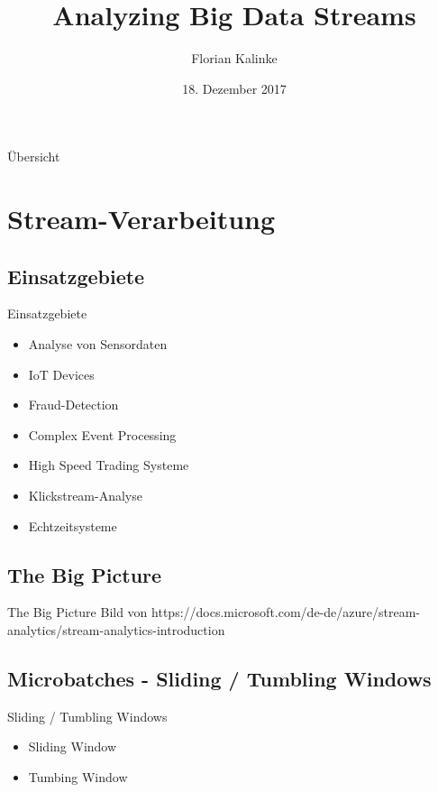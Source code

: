 \documentclass{beamer}
\title{Analyzing Big Data Streams}
\author{Florian Kalinke}
\date{18. Dezember 2017}
\begin{document}
\maketitle

\begin{frame}[t]{Übersicht}
  \tableofcontents
\end{frame}


\section{Stream-Verarbeitung}

\subsection{Einsatzgebiete}
\begin{frame}[t]{Einsatzgebiete}
\begin{itemize}
  \item Analyse von Sensordaten
  \item IoT Devices
  \item Fraud-Detection
  \item Complex Event Processing
  \item High Speed Trading Systeme
  \item Klickstream-Analyse

  \item Echtzeitsysteme
\end{itemize}
\end{frame}

\subsection{The Big Picture}
\begin{frame}[t]{The Big Picture}
  Bild von https://docs.microsoft.com/de-de/azure/stream-analytics/stream-analytics-introduction 
\end{frame}

\subsection{Microbatches - Sliding / Tumbling Windows}
\begin{frame}[t]{Sliding / Tumbling Windows}
\begin{itemize}
  \item Sliding Window
  \item Tumbing Window
\end{itemize}
\end{frame}
\end{document}
